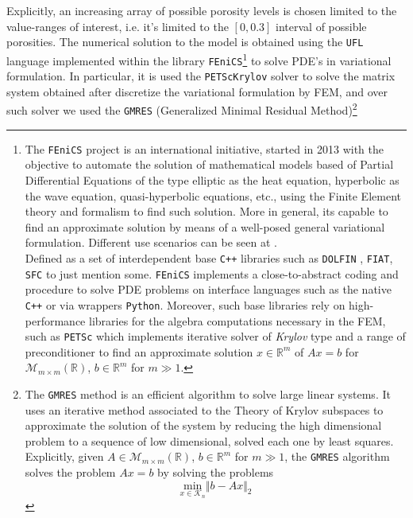 Explicitly, an increasing array of possible porosity levels is chosen limited to the value-ranges of interest, i.e. it's limited to the $[0, 0.3]$ interval of possible porosities. The numerical solution to the model is obtained using the \texttt{UFL} language implemented within the library \texttt{FEniCS}\footnote{The \texttt{FEniCS} project \cite{logg2012automated} is an international initiative, started in 2013 with the objective to automate the solution of mathematical models based of Partial Differential Equations of the type elliptic as the heat equation, hyperbolic as the wave equation, quasi-hyperbolic equations, etc., using the Finite Element theory and formalism to find such solution. More in general, its capable to find an approximate solution by means of a well-posed general variational formulation. Different use scenarios can be seen at \cite{abali2016computational}.\\
Defined as a set of interdependent base \texttt{C++} libraries such as \texttt{DOLFIN} \cite{LoggWells2010a}, \texttt{FIAT}, \texttt{SFC} to just mention some. \texttt{FEniCS} implements a close-to-abstract coding and procedure to solve PDE problems on interface languages such as the native \texttt{C++} or via wrappers \texttt{Python}. Moreover, such base libraries rely on high-performance libraries for the algebra computations necessary in the FEM, such as \texttt{PETSc} which implements iterative solver of \textit{Krylov} type and a range of preconditioner to find an approximate solution $x \in \mathbb{R}^m$ of $Ax = b$ for $\mathcal{M}_{m \times m}(\mathbb{R})$, $b \in \mathbb{R}^m$ for $m \gg 1$.} to solve PDE's in variational formulation. In particular, it is used the \texttt{PETScKrylov} solver to solve the matrix system obtained after discretize the variational formulation by FEM, and over such solver we used the \texttt{GMRES} (Generalized Minimal Residual Method)\footnote{The \texttt{GMRES} method is an efficient algorithm to solve large linear systems. It uses an iterative method associated to the Theory of Krylov subspaces to approximate the solution of the system by reducing the high dimensional problem to a sequence of low dimensional, solved each one by least squares.
Explicitly, given $A \in \mathcal{M}_{m\times m} (\mathbb{R})$, $b \in \mathbb{R}^m$ for $m\gg 1$, the \texttt{GMRES} algorithm solves the problem $A x = b$ by solving the problems 
\begin{equation*}
    \underset{x \in \mathcal{K}_n}{\text{ min }} \Vert b - Ax \Vert_2   
\end{equation*} 
}
